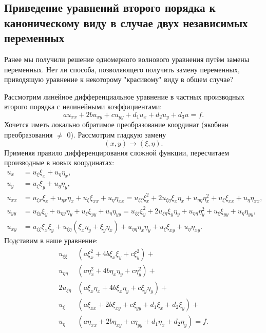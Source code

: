 
\subsection{Приведение уравнений второго порядка к каноническому виду в случае двух независимых переменных}

Ранее мы получили решение одномерного волнового уравнения путём замены переменных. Нет ли способа, позволяющего получить замену переменных, приводящую уравнение к некоторому "красивому" виду в общем случае?

Рассмотрим линейное дифференциальное уравнение в частных производных второго порядка с нелинейными коэффициентами:
$$ a u_{xx} + 2bu_{xy} + c u_{yy} + d_1 u_x + d_2 u_y + d_3 u = f.$$
Хочется иметь локально обратимое преобразование координат (якобиан преобразования $\neq$ 0). Рассмотрим гладкую замену 
$$(x,y) \rightarrow (\xi, \eta).$$
Применяя правило дифференцирования сложной функции, пересчитаем производные в новых координатах:
\begin{align*}
	u_x &= u_\xi \xi_x + u_\eta \eta_x, \\
	u_y &= u_\xi \xi_y + u_\eta \eta_y, \\
	u_{xx} &= u_{\xi x} \xi_x + u_{\eta x} \eta_x + u_\xi \xi_{xx} + u_\eta \eta_{xx} = u_{\xi \xi} \xi^2_x + 2u_{\xi \eta} \xi_x \eta_x + u_{\eta \eta} \eta^2_x + u_\xi \xi_{xx} + u_\eta \eta_{xx}, \\
	u_{yy} &= u_{\xi y} \xi_y + u_{\eta y} \eta_y + u_\xi \xi_{yy} + u_\eta \eta_{yy} = u_{\xi \xi} \xi^2_y + 2u_{\xi \eta} \xi_y \eta_y + u_{\eta \eta} \eta^2_y + u_\xi \xi_{yy} + u_\eta \eta_{yy}, \\
	u_{xy} &= u_{\xi \xi} \xi_x \xi_y + u_{\xi \eta} (\xi_x \eta_y + \xi_y \eta_x) + u_{\eta \eta} \eta_x \eta_y + u_\xi \xi_{xy} + u_\eta \eta_{xy}.
\end{align*}
Подставим в наше уравнение:
\begin{align*}
	u_{\xi \xi} & (a \xi^2_x + 4b \xi_x \xi_y + c \xi^2_y) + \\
	u_{\eta \eta} & (a \eta^2_x + 4b \eta_x \eta_y + c \eta^2_y) +\\
	2 u_{\xi \eta} & (a \xi_x \eta_x + 4b \xi_x \eta_y + c \xi_y \eta_y) + \\
	u_\xi & (a \xi_{xx} + 2b \xi_{xy} + c \xi_{yy} + d_1\xi_x + d_2 \xi_y) + \\
	u_\eta & (a \eta_{xx} + 2b \eta_{xy} + c \eta_{yy} + d_1 \eta_x + d_2 \eta_y) = f.
\end{align*}


